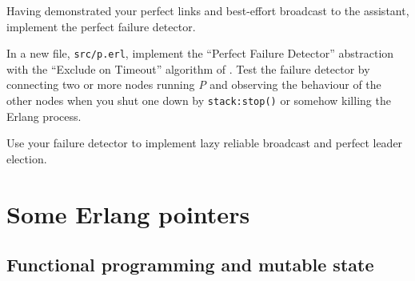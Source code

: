 \documentclass[a4paper]{article}
\newcommand{\union}{\cup}
\begin{document}
Having demonstrated your perfect links and best-effort broadcast to the
assistant, implement the perfect failure detector.

In a new file, \verb!src/p.erl!, implement the ``Perfect Failure Detector''
abstraction with the ``Exclude on Timeout'' algorithm of \cite{cachin2011}. Test the
failure detector by connecting two or more nodes running \emph{P} and
observing the behaviour of the other nodes when you shut one down by
\verb!stack:stop()! or somehow killing the Erlang process.

Use your failure detector to implement lazy reliable broadcast and perfect
leader election.

%
%
%
%
%
%
%
%







\section{Some Erlang pointers} %
\label{sec:some_erlang_pointers}

\subsection{Functional programming and mutable state} %
\label{sub:_state_}
\end{document}
